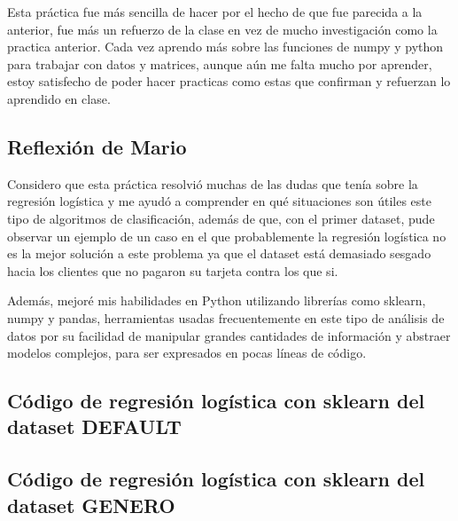 \documentclass[sigconf,authorversion,nonacm]{acmart}
\begin{document}
Esta práctica fue más sencilla de hacer por el hecho de que fue parecida a la anterior, fue más un refuerzo de la clase en vez de mucho investigación como la practica anterior. Cada vez aprendo más sobre las funciones de numpy y python para trabajar con datos y matrices, aunque aún me falta mucho por aprender, estoy satisfecho de poder hacer practicas como estas que confirman y refuerzan lo aprendido en clase.


\subsection{Reflexión de Mario}
Considero que esta práctica resolvió muchas de las dudas que tenía sobre la regresión logística y me ayudó a comprender en qué situaciones son útiles este tipo de algoritmos de clasificación, además de que, con el primer dataset, pude observar un ejemplo de un caso en el que probablemente la regresión logística no es la mejor solución a este problema ya que el dataset está demasiado sesgado hacia los clientes que no pagaron su tarjeta contra los que si.

Además, mejoré mis habilidades en Python utilizando librerías como sklearn, numpy y pandas, herramientas usadas frecuentemente en este tipo de análisis de datos por su facilidad de manipular grandes cantidades de información y abstraer modelos complejos, para ser expresados en pocas líneas de código.





\clearpage

\appendix

\lstset{style=customstyle}

\begin{figure*}
  \section{Código de regresión logística con sklearn del dataset DEFAULT}
  
\end{figure*}

\begin{figure*}
  \section{Código de regresión logística con sklearn del dataset GENERO}
  
\end{figure*}
\end{document}
